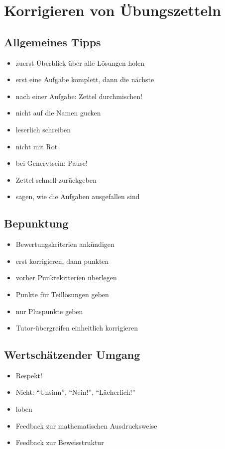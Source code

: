 \chapter{Korrigieren von Übungszetteln}

\section{Allgemeines Tipps}
\begin{itemize}
  \item zuerst Überblick über alle Lösungen holen
  \item erst eine Aufgabe komplett, dann die nächste
  \item nach einer Aufgabe: Zettel durchmischen!
  \item nicht auf die Namen gucken
  \item leserlich schreiben
  \item nicht mit Rot
  \item bei Genervtsein: Pause!
  \item Zettel schnell zurückgeben
  \item sagen, wie die Aufgaben ausgefallen sind
\end{itemize}

\section{Bepunktung}
\begin{itemize}
  \item Bewertungskriterien ankündigen
  \item erst korrigieren, dann punkten
  \item vorher Punktekriterien überlegen
  \item Punkte für Teillösungen geben
  \item nur Pluspunkte geben
  \item Tutor-übergreifen einheitlich korrigieren
\end{itemize}

\section{Wertschätzender Umgang}
\begin{itemize}
  \item Respekt!
  \item Nicht: "`Unsinn"', "`Nein!"', "`Lächerlich!"'
  \item loben
  \item Feedback zur mathematischen Ausdrucksweise
  \item Feedback zur Beweisstruktur
\end{itemize}
